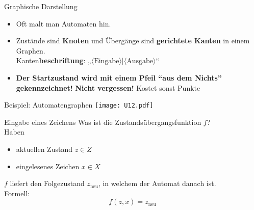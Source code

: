 \begin{frame}{}
	\begin{block}{Graphische Darstellung}
		\begin{itemize}
			\item Oft malt man Automaten hin.
			\item Zustände sind \textbf{Knoten} und Übergänge sind \textbf{gerichtete Kanten} in einem Graphen. \\
			Kanten\textbf{beschriftung}: „$\langle\text{Eingabe}\rangle | \langle\text{Ausgabe}\rangle$“
			\item \textbf{Der Startzustand wird mit einem Pfeil \enquote{aus dem Nichts} gekennzeichnet!}  \pause
			\implitem \textbf{Nicht vergessen!} Kostet sonst Punkte
		\end{itemize}
		
	\end{block}
\end{frame}

\begin{frame}{Beispiel: Automatengraphen}
	\texttt{[image: U12.pdf]}	
\end{frame}



\begin{frame}{Eingabe eines Zeichens}
	Was ist die Zustandsübergangsfunktion $f$? \\ \pause
	\medskip
	Haben
	\begin{itemize}
		\item aktuellen Zustand $z \in Z$
		\item eingelesenes Zeichen $x \in X$
	\end{itemize}
	\impl $f$ liefert den Folgezustand $z_\text{neu}$, in welchem der Automat danach ist.\\
	\medskip
	Formell: $$ f(z,x) = z_\text{neu} $$ 
\end{frame}

